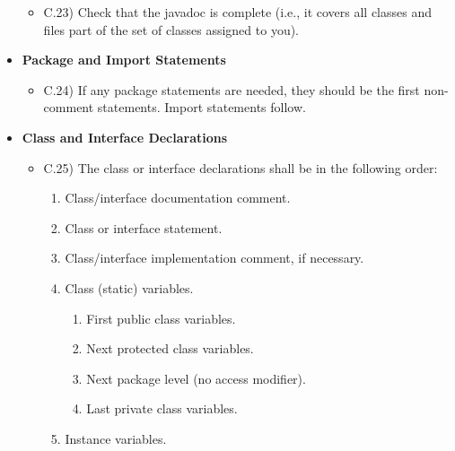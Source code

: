 \documentclass[../../codeInspection.tex]{subfiles}
\begin{document}
\begin{itemize}
\begin{itemize}
							\item C.23)\label{C:23} Check that the javadoc is complete (i.e., it covers all classes and files part of the set of classes assigned to you).

						\end{itemize}

				\item 	\textbf{Package and Import Statements}
						\begin{itemize}

							\item C.24)\label{C:24} If any package statements are needed, they should be the first non- comment statements. Import statements follow.

						\end{itemize}

				\item 	\textbf{Class and Interface Declarations}
						\begin{itemize}

							\item C.25)\label{C:25} The class or interface declarations shall be in the following order:
								\begin{enumerate}

									\item Class/interface documentation comment.

									\item Class or interface statement.

									\item Class/interface implementation comment, if necessary.

									\item Class (static) variables.

										\begin{enumerate}

											\item First public class variables.

											\item Next protected class variables.

											\item Next package level (no access modifier).

											\item Last private class variables.

										\end{enumerate}

									\item Instance variables.


\end{enumerate}
\end{itemize}
\end{itemize}
\end{document}
